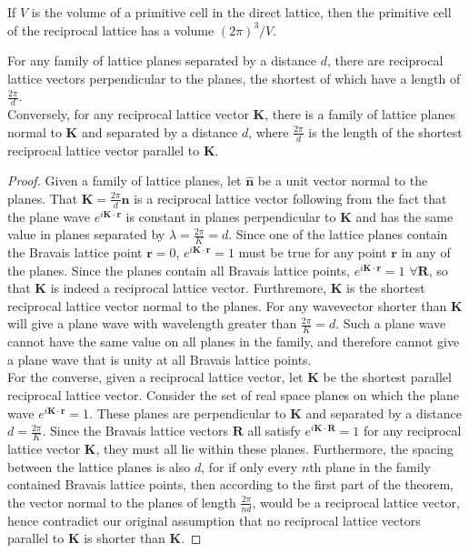 \documentclass[a4paper]{article}
\begin{document}
\begin{cor}
If $V$ is the volume of a primitive cell in the direct lattice, then the primitive cell of the reciprocal lattice has a volume $(2\pi)^3/V$. 
\end{cor}
\begin{thm}
For any family of lattice planes separated by a distance $d$, there are reciprocal lattice vectors perpendicular to the planes, the shortest of which have a length of $\frac{2\pi}{d}$.\\[5pt]
Conversely, for any reciprocal lattice vector $\mathbf{K}$, there is a family of lattice planes normal to $\mathbf{K}$ and separated by a distance $d$, where $\frac{2\pi}{d}$ is the length of the shortest reciprocal lattice vector parallel to $\mathbf{K}$.
\end{thm}
\begin{proof}
Given a family of lattice planes, let $\mathbf{\hat{n}}$ be a unit vector normal to the planes. That $\mathbf{K}=\frac{2\pi}{d}\mathbf{\hat{n}}$ is a reciprocal lattice vector following from the fact that the plane wave $e^{i\mathbf{K}\cdot\mathbf{r}}$ is constant in planes perpendicular to $\mathbf{K}$ and has the same value in planes separated by $\lambda=\frac{2\pi}{K}=d$. Since one of the lattice planes contain the Bravais lattice point $\mathbf{r}=0$, $e^{i\mathbf{K}\cdot\mathbf{r}}=1$ must be true for any point $\mathbf{r}$ in any of the planes. Since the planes contain all Bravais lattice points, $e^{i\mathbf{K}\cdot\mathbf{r}}=1$ $\forall\mathbf{R}$, so that $\mathbf{K}$ is indeed a reciprocal lattice vector. Furthremore, $\mathbf{K}$ is the shortest reciprocal lattice vector normal to the planes. For any wavevector shorter than $\mathbf{K}$ will give a plane wave with wavelength greater than $\frac{2\pi}{K}=d$. Such a plane wave cannot have the same value on all planes in the family, and therefore cannot give a plane wave that is unity at all Bravais lattice points.\\[5pt]
For the converse, given a reciprocal lattice vector, let $\mathbf{K}$ be the shortest parallel reciprocal lattice vector. Consider the set of real space planes on which the plane wave $e^{i\mathbf{K}\cdot\mathbf{r}}=1$. These planes are perpendicular to $\mathbf{K}$ and separated by a distance $d=\frac{2\pi}{K}$. Since the Bravais lattice vectors $\mathbf{R}$ all satisfy $e^{i\mathbf{K}\cdot\mathbf{R}}=1$ for any reciprocal lattice vector $\mathbf{K}$, they must all lie within these planes. Furthermore, the spacing between the lattice planes is also $d$, for if only every $n$th plane in the family contained Bravais lattice points, then according to the first part of the theorem, the vector normal to the planes of length $\frac{2\pi}{nd}$, would be a reciprocal lattice vector, hence contradict our original assumption that no reciprocal lattice vectors parallel to $\mathbf{K}$ is shorter than $\mathbf{K}$.
\end{proof}
\end{document}
